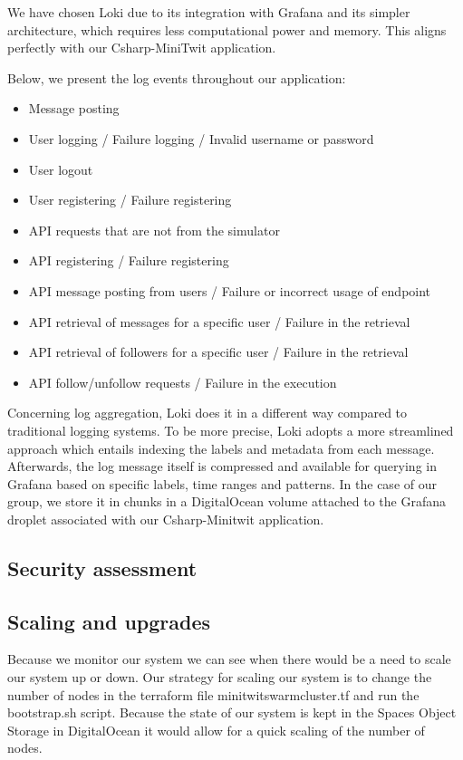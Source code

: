 We have chosen Loki due to its integration with Grafana and its simpler architecture, which requires less computational power and memory. This aligns perfectly with our Csharp-MiniTwit application. \newline

Below, we present the log events throughout our application:
\begin{itemize}
    \item Message posting
    \item User logging / Failure logging / Invalid username or password
    \item User logout
    \item User registering / Failure registering
    \item API requests that are not from the simulator
    \item API registering / Failure registering
    \item API message posting from users / Failure or incorrect usage of endpoint
    \item API retrieval of messages for a specific user / Failure in the retrieval
    \item API retrieval of followers for a specific user / Failure in the retrieval
    \item API follow/unfollow requests / Failure in the execution
    
\end{itemize}

Concerning log aggregation, Loki does it in a different way compared to traditional logging systems. To be more precise, Loki adopts a more streamlined approach which entails indexing the labels and metadata from each message. Afterwards, the log message itself is compressed and available for querying in Grafana based on specific labels, time ranges and patterns. In the case of our group, we store it in chunks in a DigitalOcean volume attached to the Grafana droplet associated with our Csharp-Minitwit application.


\subsection{Security assessment}


\subsection{Scaling and upgrades}
Because we monitor our system we can see when there would be a need to scale our system up or down. Our strategy for scaling our system is to change the number of nodes in the terraform file minitwit\textunderscore swarm\textunderscore cluster.tf and run the bootstrap.sh script. Because the state of our system is kept in the Spaces Object Storage in DigitalOcean it would allow for a quick scaling of the number of nodes. 

